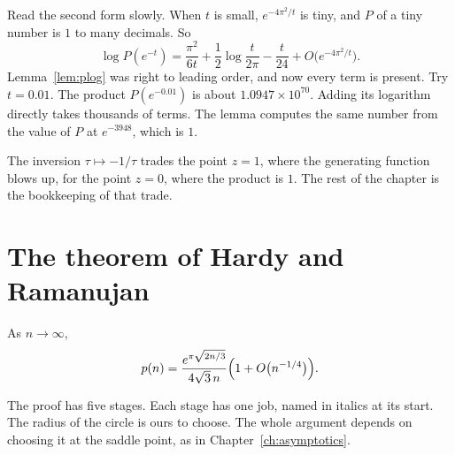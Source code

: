 Read the second form slowly. When $t$ is small, $e^{-4\pi^2/t}$ is tiny, and $P$ of a tiny number is $1$ to many decimals. So
\[
\log P(e^{-t})=\frac{\pi^2}{6t}+\frac12\log\frac t{2\pi}-\frac t{24}+O\bigl(e^{-4\pi^2/t}\bigr).
\]
Lemma~\ref{lem:plog} was right to leading order, and now every term is present. Try $t=0.01$. The product $P(e^{-0.01})$ is about $1.0947\times10^{70}$. Adding its logarithm directly takes thousands of terms. The lemma computes the same number from the value of $P$ at $e^{-3948}$, which is $1$.

The inversion $\tau\mapsto-1/\tau$ trades the point $z=1$, where the generating function blows up, for the point $z=0$, where the product is $1$. The rest of the chapter is the bookkeeping of that trade.

\section{The theorem of Hardy and Ramanujan}

\begin{theorem}\label{thm:hr}
As $n\to\infty$,
\[
p(n)=\frac{e^{\pi\sqrt{2n/3}}}{4\sqrt3\,n}\Bigl(1+O\bigl(n^{-1/4}\bigr)\Bigr).
\]
\end{theorem}

The proof has five stages. Each stage has one job, named in italics at its start. The radius of the circle is ours to choose. The whole argument depends on choosing it at the saddle point, as in Chapter~\ref{ch:asymptotics}.


